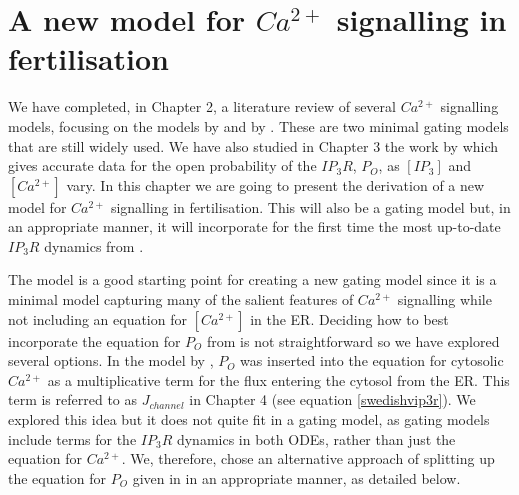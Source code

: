 
\chapter{A new model for ${Ca^{2+}}$ signalling in fertilisation}

We have completed, in Chapter 2, a literature review of several $Ca^{2+}$ signalling models, focusing on the models by  and by . These are two minimal gating models that are still widely used. We have also studied in Chapter 3 the work by  which gives accurate data for the open probability of the $IP_3R$, $P_O$, as $[IP_3]$ and $[Ca^{2+}]$ vary. In this chapter we are going to present the derivation of a new model for $Ca^{2+}$ signalling in fertilisation. This will also be a gating model but, in an appropriate manner, it will incorporate for the first time the most up-to-date $IP_3R$ dynamics from .

The  model is a good starting point for creating a new gating model since it is a minimal model capturing many of the salient features of $Ca^{2+}$ signalling while not including an equation for $[Ca^{2+}]$ in the ER. Deciding how to best incorporate the equation for $P_O$ from  is not straightforward so we have explored several options. In the model by , $P_O$ was inserted into the equation for cytosolic $Ca^{2+}$ as a multiplicative term for the flux entering the cytosol from the ER. This term is referred to as $J_{channel}$ in Chapter 4 (see equation \eqref{swedishvip3r}). We explored this idea but it does not quite fit in a gating model, {as gating models include terms for the $IP_3R$ dynamics in both ODEs, rather than just the equation for $Ca^{2+}$.} We, therefore, chose an alternative approach of splitting up the equation for $P_O$ given in  in an appropriate manner, as detailed below.

